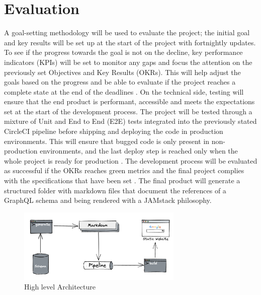\section*{Evaluation}
\label{s:Evaluation}
A goal-setting methodology will be used to evaluate the project; the initial
goal and key results will be set up at the start of the project with fortnightly
updates. To see if the progress towards the goal is not on the decline, key
performance indicators (KPIs) will be set to monitor any gaps and focus the
attention on the previously set Objectives and Key Results (OKRs). This will
help adjust the goals based on the progress and be able to evaluate if the
project reaches a complete state at the end of the deadlines
\citep{helmoldLeanManagementKPI2020}. On the technical side, testing will ensure
that the end product is performant, accessible and meets the expectations set at
the start of the development process. The project will be tested through a
mixture of Unit and End to End (E2E) tests integrated into the previously stated
CircleCI pipeline before shipping and deploying the code in production
environments. This will ensure that bugged code is only present in
non-production environments, and the last deploy step is reached only when the
whole project is ready for production \citep{yuUtilisingCIEnvironment2020}. The
development process will be evaluated as successful if the OKRs reaches green
metrics and the final project complies with the specifications that have been
set \citep{helmoldLeanManagementKPI2020}. The final product will generate a
structured folder with markdown files that document the references of a GraphQL
schema and being rendered with a JAMstack philosophy.
\begin{figure}[H]
  \centering
  \includegraphics[width=0.7\textwidth]{figures/architecture}
  \caption{High level Architecture}
  \label{f:architecture}
\end{figure}
